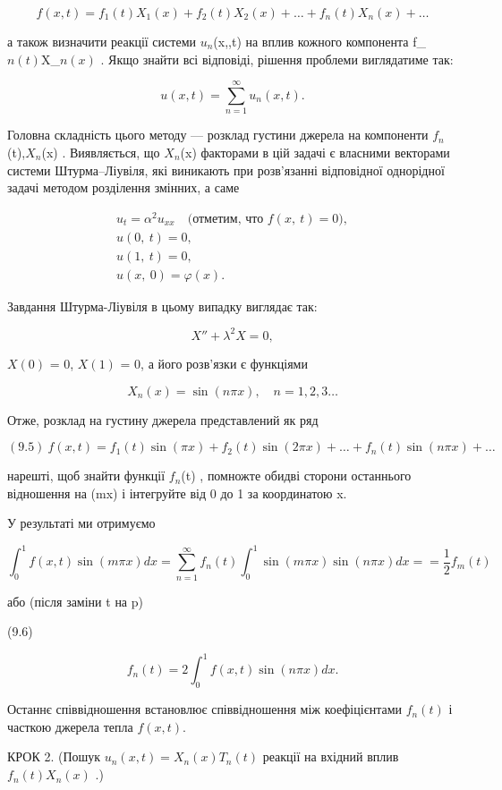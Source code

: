 \documentclass[
  ukrainian,
]{article}
\begin{document}
\[
f(x, t) = f_1(t) X_1(x) + f_2(t) X_2(x) + \dots + f_n(t) X_n(x) + \dots
\]

а також визначити реакції системи \(u_n\)\left(x,,t\right) на вплив
кожного компонента f\_\(n\left(t\right)\)X\_\(n\left(x\right)\) . Якщо
знайти всі відповіді, рішення проблеми виглядатиме так:

\[
u(x, t) = \sum_{n=1}^{\infty} u_n(x, t).
\]

Головна складність цього методу --- розклад густини джерела на
компоненти \(f_n\)(t),\(X_n\)(x) . Виявляється, що \(X_n\)(x) факторами
в цій задачі є власними векторами системи Штурма--Ліувіля, які виникають
при розв'язанні відповідної однорідної задачі методом розділення
змінних, а саме

\[
\begin{array}{c} u_t = \alpha^2 u_{xx} \quad \text{(отметим, что } f(x, \ t) = 0), \\ u(0, \ t) = 0, \\ u(1, \ t) = 0, \\ u(x, \ 0) = \varphi(x). \end{array}
\]

Завдання Штурма-Ліувіля в цьому випадку виглядає так:

\[
X'' + \lambda^2 X = 0,
\]

\(X(0)\) = 0, \(X(1)\) = 0, а його розв'язки є функціями

\[
X_n(x) = \sin(n\pi x), \quad n = 1, 2, 3 \dots
\]

Отже, розклад на густину джерела представлений як ряд

\[
(9.5) \ f(x,t) = f_1(t) \sin(\pi x) + f_2(t) \sin(2\pi x) + \dots + f_n(t) \sin(n\pi x) + \dots
\]

 нарешті, щоб знайти функції \(f_n\)(t) , помножте обидві
сторони останнього відношення на \sin(m\pi x) і інтегруйте від 0 до 1 за
координатою x.

У результаті ми отримуємо

\[
\int_{0}^{1} f(x, t) \sin(m\pi x) dx = \sum_{n=1}^{\infty} f_{n}(t) \int_{0}^{1} \sin(m\pi x) \sin(n\pi x) dx =
= \frac{1}{2} f_{m}(t)
\]

або (після заміни t на p)

(9.6)

\[
f_{n}(t) = 2 \int_{0}^{1} f(x, t) \sin(n\pi x) dx.
\]

Останнє співвідношення встановлює співвідношення між коефіцієнтами
\(f_n(t)\) і часткою джерела тепла \(f(x, t)\).

КРОК 2. (Пошук \(u_n(x, t) = X_n(x) T_n(t)\) реакції на вхідний вплив
\(f_n(t) X_n(x)\) .)
\end{document}
